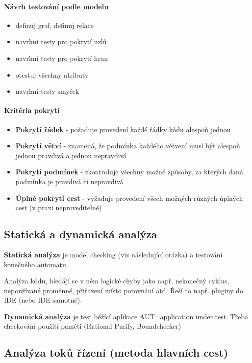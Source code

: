 \paragraph{Návrh testování podle modelu}
\begin{itemize}[itemsep=0px]
\item definuj graf, definuj relace
\item navrhni testy pro pokrytí uzlů
\item navrhni testy pro pokrytí hran
\item otestuj všechny atributy
\item navrhni testy smyček
\end{itemize}

\paragraph{Kritéria pokrytí}
\begin{itemize}[itemsep=0px]
\item \textbf{Pokrytí řádek} - požaduje provedení každé řádky kódu alespoň jednou
\item \textbf{Pokrytí větví} - znamená, že podmínka každého větvení musí být alespoň jednou pravdivá a jednou nepravdivá
\item \textbf{Pokrytí podmínek} - zkontroluje všechny možné způsoby, za kterých daná podmínka je pravdivá či nepravdivá
\item \textbf{Úplné pokrytí cest} - vyžaduje provedení všech možných různých úplných cest (v praxi neproveditelné)
\end{itemize}

\subsection{Statická a dynamická analýza}
\textbf{Statická analýza} je model checking (viz následující otázka) a testování konečného automatu.

Analýza kódu, hledájí se v něm logické chyby jako např. nekonečný cyklus, nepoužívané proměnné, přiřazení místo porovnání atd. Řeší to např. pluginy do IDE (nebo IDE samotné).

\textbf{Dynamická analýza} je test běžící aplikace AUT=application under test. Třeba checkování použití paměti (Rational Purify, Boundchecker)

\subsection{Analýza toků řízení (metoda hlavních cest)}

